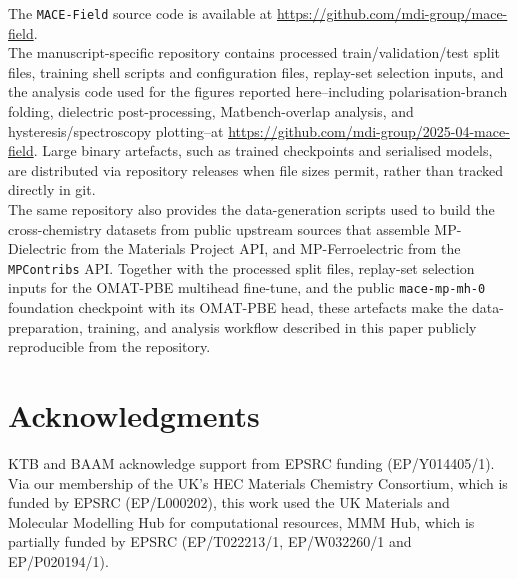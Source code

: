 \documentclass[aps,physrev,graphicx,amsmath,amssymb,
               reprint,superscriptaddress]{revtex4-2}
\begin{document}
The \texttt{MACE-Field} source code is available at \url{https://github.com/mdi-group/mace-field}.
\\

The manuscript-specific repository contains processed train/validation/test split files, training shell scripts and configuration files, replay-set selection inputs, and the analysis code used for the figures reported here--including polarisation-branch folding, dielectric post-processing, Matbench-overlap analysis, and hysteresis/spectroscopy plotting--at \url{https://github.com/mdi-group/2025-04-mace-field}. Large binary artefacts, such as trained checkpoints and serialised models, are distributed via repository releases when file sizes permit, rather than tracked directly in git.
\\

The same repository also provides the data-generation scripts used to build the cross-chemistry datasets from public upstream sources that assemble MP-Dielectric from the Materials Project API, and MP-Ferroelectric from the \texttt{MPContribs} API. Together with the processed split files, replay-set selection inputs for the OMAT-PBE multihead fine-tune, and the public \texttt{mace-mp-mh-0} foundation checkpoint with its OMAT-PBE head, these artefacts make the data-preparation, training, and analysis workflow described in this paper publicly reproducible from the repository.
\\

\section*{Acknowledgments}

KTB and BAAM acknowledge support from EPSRC funding (EP/Y014405/1). Via our membership of the UK's HEC Materials Chemistry Consortium, which is funded by EPSRC (EP/L000202), this work used the UK Materials and Molecular Modelling Hub for computational resources, MMM Hub, which is partially funded by EPSRC (EP/T022213/1, EP/W032260/1 and EP/P020194/1).




% 
\end{document}
